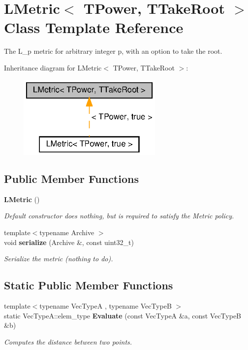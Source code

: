 \section{L\+Metric$<$ T\+Power, T\+Take\+Root $>$ Class Template Reference}
\label{classmlpack_1_1metric_1_1LMetric}


The L\+\_\+p metric for arbitrary integer p, with an option to take the root.  




Inheritance diagram for L\+Metric$<$ T\+Power, T\+Take\+Root $>$\+:
\nopagebreak
\begin{figure}[H]
\begin{center}
\leavevmode
\includegraphics[width=200pt]{classmlpack_1_1metric_1_1LMetric__inherit__graph}
\end{center}
\end{figure}
\subsection*{Public Member Functions}
\begin{DoxyCompactItemize}
\item 
\textbf{ L\+Metric} ()
\begin{DoxyCompactList}\small\item\em Default constructor does nothing, but is required to satisfy the Metric policy. \end{DoxyCompactList}\item 
{\footnotesize template$<$typename Archive $>$ }\\void \textbf{ serialize} (Archive \&, const uint32\+\_\+t)
\begin{DoxyCompactList}\small\item\em Serialize the metric (nothing to do). \end{DoxyCompactList}\end{DoxyCompactItemize}
\subsection*{Static Public Member Functions}
\begin{DoxyCompactItemize}
\item 
{\footnotesize template$<$typename Vec\+TypeA , typename Vec\+TypeB $>$ }\\static Vec\+Type\+A\+::elem\+\_\+type \textbf{ Evaluate} (const Vec\+TypeA \&a, const Vec\+TypeB \&b)
\begin{DoxyCompactList}\small\item\em Computes the distance between two points. \end{DoxyCompactList}\end{DoxyCompactItemize}
